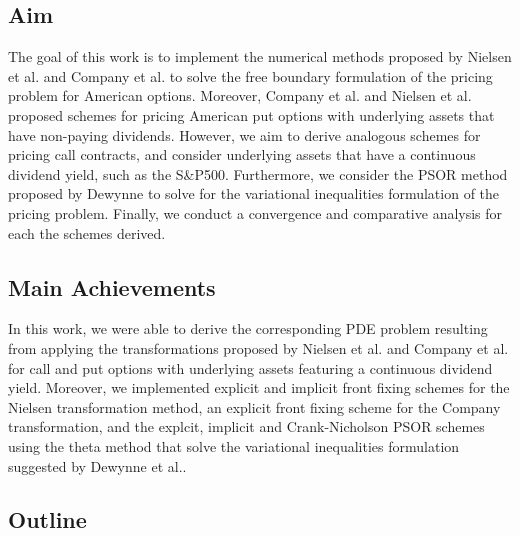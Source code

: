 \subsection{Aim} 

The goal of this work is to implement the numerical methods proposed by Nielsen et al.\cite{nielsen_2001} and Company et al.\cite{company_egorova_jodar_2014} to solve the free boundary formulation of the pricing problem for American options\cite{dewynne_howison_rupf_wilmott_1993}. Moreover, Company et al.\cite{company_egorova_jodar_2014} and Nielsen et al.\cite{nielsen_2001} proposed schemes for pricing American put options with underlying assets that have non-paying dividends. However, we aim to derive analogous schemes for pricing call contracts, and consider underlying assets that have a continuous dividend yield, such as the S\&P500.  Furthermore, we consider the PSOR method proposed by Dewynne\cite{dewynne_howison_rupf_wilmott_1993}\cite{dewynne_howison_wilmott_howison_1995} to solve for the variational inequalities formulation of the pricing problem. Finally, we conduct a convergence and comparative analysis for each the schemes derived.

\subsection{Main Achievements}

In this work, we were able to derive the corresponding PDE problem resulting from applying the transformations proposed by Nielsen et al.\cite{nielsen_2001} and Company et al.\cite{company_egorova_jodar_2014} for call and put options with underlying assets featuring a continuous dividend yield. Moreover, we implemented explicit and implicit front fixing schemes for the Nielsen transformation method\cite{nielsen_2001}, an explicit front fixing scheme for the Company transformation, and the explcit, implicit and Crank-Nicholson PSOR schemes using the theta method that solve the variational inequalities formulation suggested by Dewynne et al.\cite{dewynne_howison_wilmott_howison_1995}.

\subsection{Outline}

